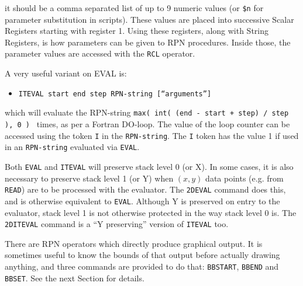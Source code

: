 \documentclass[a4paper,twoside,11pt]{article}
\newcommand{\newpara}{\par\vspace{4mm}\noindent}
\newcommand{\textttc}[1]{\texttt{\textcolor{OurRed}{#1}}}
\begin{document}
it should be a comma separated list of up to 9 numeric values (or \texttt{\$n} for parameter substitution in scripts). These
values are placed into successive Scalar Registers starting with register 1. Using these registers, along with String Registers,
is how parameters can be given to RPN procedures. Inside those, the parameter values are accessed with the \texttt{RCL} operator.
\newpara
A very useful variant on EVAL is:
\begin{itemize}
\item \textttc{ITEVAL start end step RPN-string [``arguments'']}
\end{itemize}
which will evaluate the RPN-string \texttt{max( int( (end - start + step) / step ), 0 ) } times, as per a Fortran DO-loop. The value of
the loop counter can be accessed using the token \texttt{I} in the \texttt{RPN-string}.
The \texttt{I} token has the value 1 if used in an
\texttt{RPN-string} evaluated via \texttt{EVAL}.
\newpara
Both \texttt{EVAL} and \texttt{ITEVAL} will preserve stack level 0 (or X). In some cases, it is also necessary to preserve
stack level 1 (or Y) when $(x,y)$ data points (e.g. from \texttt{READ}) are to be processed with the evaluator.
The \textttc{2DEVAL} command does this, and is otherwise equivalent to \texttt{EVAL}. Although Y is preserved on entry to
the evaluator, stack level 1 is not otherwise protected in the way stack level 0 is. The \textttc{2DITEVAL}
command is a ``Y preserving'' version of \texttt{ITEVAL} too.
\newpara
There are RPN operators which directly produce graphical output. It is sometimes useful to know the bounds of that output before
actually drawing anything, and three commands are provided to do that: \texttt{BBSTART}, \texttt{BBEND} and \texttt{BBSET}. See
the next Section for details.
\end{document}
